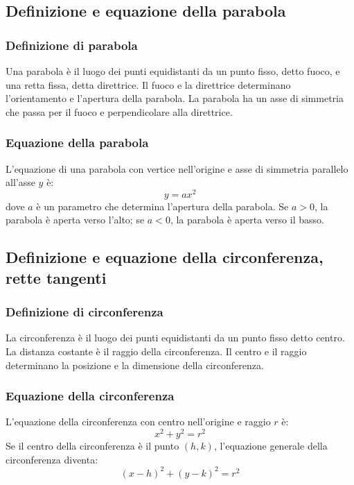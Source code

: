 \documentclass{article}
\begin{document}
\newpage
\subsection{Definizione e equazione della parabola}

\subsubsection{Definizione di parabola}
Una parabola è il luogo dei punti equidistanti da un punto fisso, detto fuoco, e una retta
fissa, detta direttrice. Il fuoco e la direttrice determinano l'orientamento e l'apertura
della parabola. La parabola ha un asse di simmetria che passa per il fuoco e perpendicolare
alla direttrice.

\subsubsection{Equazione della parabola}
L'equazione di una parabola con vertice nell'origine e asse di simmetria parallelo all'asse
\(y\) è:
\[
    y = ax^2
\]
dove \(a\) è un parametro che determina l'apertura della parabola. Se \(a > 0\), la parabola
è aperta verso l'alto; se \(a < 0\), la parabola è aperta verso il basso.


\newpage
\subsection{Definizione e equazione della circonferenza, rette tangenti}

\subsubsection{Definizione di circonferenza}
La circonferenza è il luogo dei punti equidistanti da un punto fisso detto centro. La distanza
costante è il raggio della circonferenza. Il centro e il raggio determinano la posizione e la
dimensione della circonferenza.

\subsubsection{Equazione della circonferenza}
L'equazione della circonferenza con centro nell'origine e raggio \(r\) è:
\[
    x^2 + y^2 = r^2
\]
Se il centro della circonferenza è il punto \((h, k)\), l'equazione generale della
circonferenza diventa:
\[
    (x - h)^2 + (y - k)^2 = r^2
\]
\end{document}
